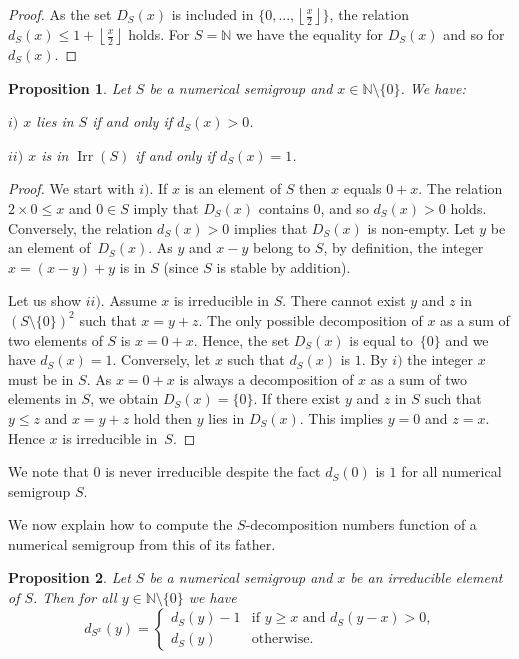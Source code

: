 \documentclass[reqno,11pt]{amsart}
\theoremstyle{plain}
\newtheorem{prop}{Proposition}[section]
\theoremstyle{definition}
\renewcommand{\leq}{\leqslant}
\renewcommand{\geq}{\geqslant}
\newcommand{\NN}{\mathbb{N}}
\DeclareMathOperator{\Irr}{Irr}
\begin{document}
\begin{proof}
As the set $D_S(x)$ is included in $\{0,...,\left\lfloor\frac x2\right\rfloor\}$, the relation $d_S(x)\leq 1+\left\lfloor \frac{x}2\right\rfloor$ holds.
For $S=\NN$ we have the equality for $D_S(x)$ and so for $d_S(x)$.
\end{proof}


\begin{prop}
\label{P:Dandd}
Let $S$ be a numerical semigroup and $x\in\NN\setminus\{0\}$.  We have:

 $i)$ $x$ lies in $S$ if and only if $d_S(x)>0$.

 $ii)$ $x$ is in $\Irr(S)$ if and only if $d_S(x)=1$.
\end{prop}

\begin{proof}
We start with $i)$. If $x$ is an element of $S$ then $x$ equals $0+x$. 
The relation~$2\times 0\leq x$ and $0\in S$ imply that $D_S(x)$ contains $0$, and so $d_S(x)>0$ holds.
Conversely, the relation  $d_S(x)>0$  implies that $D_S(x)$ is non-empty. 
Let $y$ be an element of~$D_S(x)$. 
As $y$ and $x-y$ belong to  $S$, by definition, the integer $x=(x-y)+y$ is in $S$  (since $S$ is stable by addition).

Let us show $ii)$. 
Assume $x$ is irreducible in $S$.
There cannot exist $y$ and $z$ in~$(S\setminus\{0\})^2$ such that $x=y+z$. 
The only possible decomposition of $x$ as a sum of two elements of $S$ is $x=0+x$. 
Hence, the set $D_S(x)$ is equal to~$\{0\}$ and we have $d_S(x)=1$. 
Conversely, let $x$ such that $d_S(x)$ is $1$. 
By  $i)$ the  integer $x$ must be in $S$. 
As $x=0+x$ is always a decomposition of $x$ as a sum of two elements in $S$, we obtain $D_S(x)=\{0\}$.
If there exist $y$ and $z$ in $S$ such that $y\leq z$ and $x=y+z$ hold then $y$ lies in $D_S(x)$. 
This implies $y=0$ and $z=x$. 
Hence $x$ is irreducible in~$S$.
\end{proof}

We note  that $0$ is never irreducible despite the fact $d_S(0)$ is $1$ for all numerical semigroup $S$.

We now explain how to compute the $S$-decomposition numbers function of a numerical semigroup  from this of its father.

\begin{prop}
Let $S$ be a numerical semigroup and $x$ be an irreducible element of $S$. 
Then for all $y\in \NN\setminus\{0\}$ we have
\[
d_{S^x}(y)=\begin{cases}
d_S(y)-1&\text{if $y\geq x$ and $d_S(y-x)>0$,}\\
d_S(y) &\text{otherwise.}
\end{cases}
\] 
\end{prop}
\end{document}
